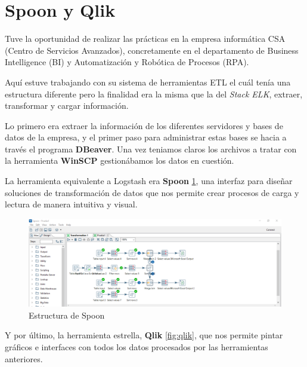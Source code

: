 \paragraph{            }
\paragraph{            }


\section{Spoon y Qlik}
Tuve la oportunidad de realizar las prácticas en la empresa informática CSA (Centro de Servicios Avanzados), concretamente en el departamento de Business Intelligence (BI) y Automatización y Robótica de Procesos (RPA). 

Aquí estuve trabajando con su sistema de herramientas ETL el cuál tenía una estructura diferente pero la finalidad era la misma que la del \textit{Stack ELK}, extraer, transformar y cargar información.

Lo primero era extraer la información de los diferentes servidores y bases de datos de la empresa, y el primer paso para administrar estas bases se hacia a través el programa \textbf{DBeaver}. Una vez teniamos claros los archivos a tratar con la herramienta \textbf{WinSCP} gestionábamos los datos en cuestión. 

La herramienta equivalente a Logstash era \textbf{Spoon} \ref{fig:spoon}, una interfaz para diseñar soluciones de transformación de datos que nos permite crear procesos de carga y lectura de manera intuitiva y visual.

\begin{figure}
    \centering
    \includegraphics[width=1\linewidth]{img/spoon.png}
    \caption{Estructura de Spoon \cite{Spoon} }
    \label{fig:spoon}
\end{figure}

Y por último, la herramienta estrella, \textbf{Qlik}  \ref{fig:qlik}, que nos permite pintar gráficos e interfaces con todos los datos procesados por las herramientas anteriores.

